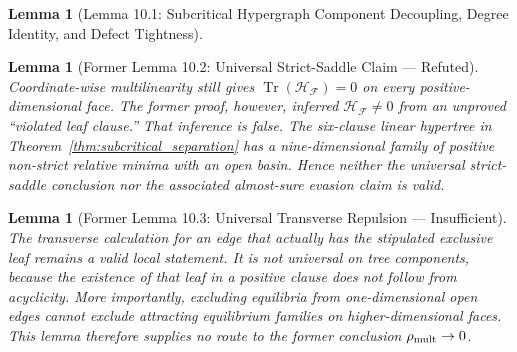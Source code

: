 \documentclass[11pt,a4paper]{article}
\newtheorem{lemma}[theorem]{Lemma}
\begin{document}
\begin{lemma}[Lemma 10.1: Subcritical Hypergraph Component Decoupling, Degree Identity, and Defect Tightness]
\begin{enumerate}
\end{enumerate}
\end{lemma}

\begin{lemma}[Former Lemma 10.2: Universal Strict-Saddle Claim --- Refuted]
\label{lem:strict_saddle}
Coordinate-wise multilinearity still gives
$\operatorname{Tr}(\mathcal H_{\mathcal F})=0$ on every positive-dimensional
face.  The former proof, however, inferred
$\mathcal H_{\mathcal F}\ne0$ from an unproved ``violated leaf clause.''  That
inference is false.  The six-clause linear hypertree in
Theorem~\ref{thm:subcritical_separation} has a nine-dimensional family of
positive non-strict relative minima with an open basin.  Hence neither the
universal strict-saddle conclusion nor the associated almost-sure evasion
claim is valid.
\end{lemma}

\begin{lemma}[Former Lemma 10.3: Universal Transverse Repulsion --- Insufficient]
\label{lem:flat_edge_instability}
The transverse calculation for an edge that actually has the stipulated
exclusive leaf remains a valid local statement.  It is not universal on tree
components, because the existence of that leaf in a positive clause does not
follow from acyclicity.  More importantly, excluding equilibria from
one-dimensional open edges cannot exclude attracting equilibrium families on
higher-dimensional faces.  This lemma therefore supplies no route to the
former conclusion $\rho_{\rm mult}\to0$.
\end{lemma}
\end{document}
